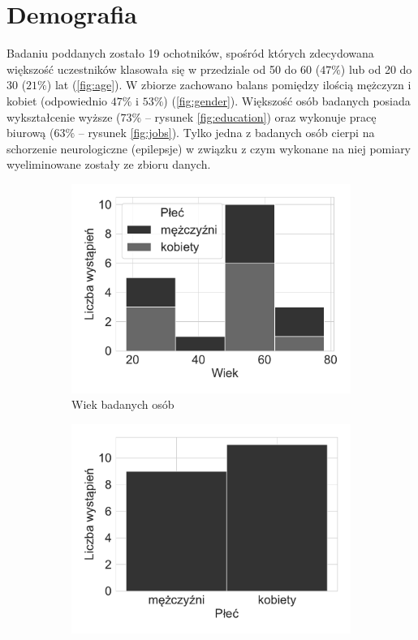 \documentclass{./assets/wfis}
\begin{document}
\section{Demografia}
Badaniu poddanych zostało 19 ochotników, spośród których zdecydowana większość uczestników klasowała się w przedziale od 50 do 60 ($47\%$) lub od 20 do 30 ($21\%$) lat (\autoref{fig:age}). W zbiorze zachowano balans pomiędzy ilością mężczyzn i kobiet (odpowiednio $47\%$ i $53\%$) (\autoref{fig:gender}). Większość osób badanych posiada wykształcenie wyższe ($73\%$ – rysunek \ref{fig:education}) oraz wykonuje pracę biurową ($63\%$ – rysunek \ref{fig:jobs}). Tylko jedna z badanych osób cierpi na schorzenie neurologiczne (epilepsje) w związku z czym wykonane na niej pomiary  wyeliminowane zostały ze zbioru danych.

\begin{figure}[h!]
\begin{subfigure}[b]{0.45\textwidth}
    \centering
    \includegraphics[width=\columnwidth]{plots/age.pdf}
    \caption{Wiek badanych osób}
    \label{fig:age}
\end{subfigure}   
\hfill
\begin{subfigure}[b]{0.45\textwidth}
    \centering
    \includegraphics[width=\columnwidth]{plots/gender.pdf}

\end{subfigure}
\end{figure}
\end{document}
